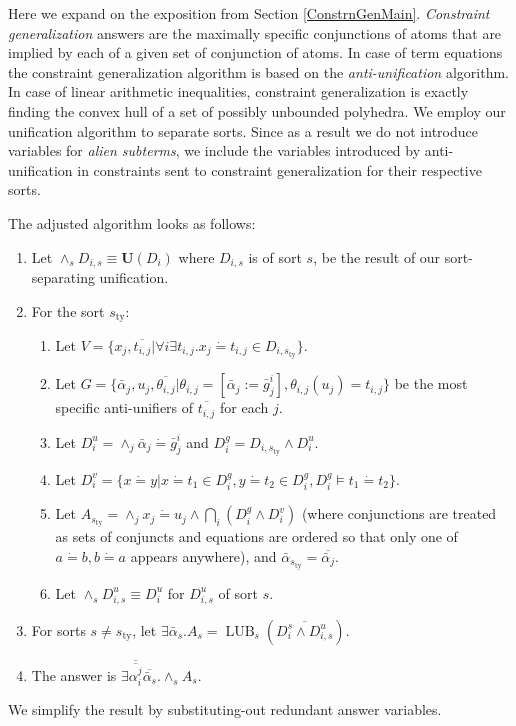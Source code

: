 \documentclass{article}
\newcommand{\assign}{:=}
\newcommand{\tmem}[1]{{\em #1\/}}
\newcommand{\tmmathbf}[1]{\ensuremath{\boldsymbol{#1}}}
\newcommand{\tmop}[1]{\ensuremath{\operatorname{#1}}}
\begin{document}
Here we expand on the exposition from Section \ref{ConstrnGenMain}.
{\tmem{Constraint generalization}} answers are the maximally specific
conjunctions of atoms that are implied by each of a given set of conjunction
of atoms. In case of term equations the constraint generalization algorithm is
based on the {\tmem{anti-unification}} algorithm. In case of linear arithmetic
inequalities, constraint generalization is exactly finding the convex hull of
a set of possibly unbounded polyhedra. We employ our unification algorithm to
separate sorts. Since as a result we do not introduce variables for
{\tmem{alien subterms}}, we include the variables introduced by
anti-unification in constraints sent to constraint generalization for their
respective sorts.

The adjusted algorithm looks as follows:
\begin{enumerate}
  \item Let $\wedge_s D_{i, s} \equiv \tmmathbf{U} (D_i)$ where $D_{i, s}$ is
  of sort $s$, be the result of our sort-separating unification.
  
  \item For the sort $s_{\tmop{ty}}$:
  \begin{enumerate}
    \item Let $V = \{ x_j, \overline{t_{i, j}} | \forall i \exists t_{i, j}
    .x_j \dot{=} t_{i, j} \in D_{i, s_{\tmop{ty}}} \}$.
    
    \item Let $G = \{ \bar{\alpha}_j, u_j, \overline{\theta_{i, j}} |
    \theta_{i, j} = [\bar{\alpha}_j \assign \bar{g}_j^i], \theta_{i, j} (u_j)
    = t_{i, j} \}$ be the most specific anti-unifiers of $\overline{t_{i, j}}$
    for each $j$.
    
    \item Let $D_i^u = \wedge_j \bar{\alpha}_j \dot{=} \bar{g}_j^i$ and $D_i^g
    = D_{i, s_{\tmop{ty}}} \wedge D_i^u$.
    
    \item Let $D^v_i = \{ x \dot{=} y | x \dot{=} t_1 \in D_i^g, y \dot{=} t_2
    \in D_i^g, D_i^g \vDash t_1 \dot{=} t_2 \}$.
    
    \item Let $A_{s_{\tmop{ty}}} = \wedge_j x_j \dot{=} u_j \wedge \bigcap_i
    (D_i^g \wedge D_i^v)$ (where conjunctions are treated as sets of conjuncts
    and equations are ordered so that only one of $a \dot{=} b, b \dot{=} a$
    appears anywhere), and $\bar{\alpha}_{s_{\tmop{ty}}} =
    \overline{\bar{\alpha}_j}$.
    
    \item Let $\wedge_s D^u_{i, s} \equiv D^u_i$ for $D^u_{i, s}$ of sort $s$.
  \end{enumerate}
  \item For sorts $s \neq s_{\tmop{ty}}$, let $\exists \bar{\alpha}_s .A_s =
  \tmop{LUB}_s (\overline{D_i^s \wedge D^u_{i, s}})$.
  
  \item The answer is $\exists \overline{\overline{\alpha^j_i}}
  \overline{\bar{\alpha}_s} . \wedge_s A_s$.
\end{enumerate}
We simplify the result by substituting-out redundant answer variables.
\end{document}
